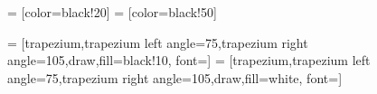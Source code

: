  = [color=black!20]
 = [color=black!50]


%

 = [trapezium,trapezium left angle=75,trapezium right angle=105,draw,fill=black!10, font=\small]
 = [trapezium,trapezium left angle=75,trapezium right angle=105,draw,fill=white, font=\small]


%

